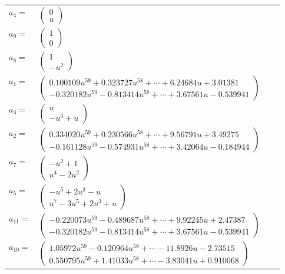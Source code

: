 \documentclass[1p]{elsarticle_modified}
\theoremstyle{definition}
\begin{document}
\begin{tabular}{m{7pt} m{180pt} m{7pt} m{180pt} }
\flushright $a_{4}=$&$\begin{pmatrix}0\\u\end{pmatrix}$ \\
\flushright $a_{9}=$&$\begin{pmatrix}1\\0\end{pmatrix}$ \\
\flushright $a_{8}=$&$\begin{pmatrix}1\\- u^2\end{pmatrix}$ \\
\flushright $a_{1}=$&$\begin{pmatrix}0.100109 u^{59}+0.323727 u^{58}+\cdots+6.24684 u+3.01381\\-0.320182 u^{59}-0.813414 u^{58}+\cdots+3.67561 u-0.539941\end{pmatrix}$ \\
\flushright $a_{3}=$&$\begin{pmatrix}u\\- u^3+u\end{pmatrix}$ \\
\flushright $a_{2}=$&$\begin{pmatrix}0.334020 u^{59}+0.230566 u^{58}+\cdots+9.56791 u+3.49275\\-0.161128 u^{59}-0.574931 u^{58}+\cdots+3.42064 u-0.184944\end{pmatrix}$ \\
\flushright $a_{7}=$&$\begin{pmatrix}- u^2+1\\u^4-2 u^2\end{pmatrix}$ \\
\flushright $a_{5}=$&$\begin{pmatrix}- u^5+2 u^3- u\\u^7-3 u^5+2 u^3+u\end{pmatrix}$ \\
\flushright $a_{11}=$&$\begin{pmatrix}-0.220073 u^{59}-0.489687 u^{58}+\cdots+9.92245 u+2.47387\\-0.320182 u^{59}-0.813414 u^{58}+\cdots+3.67561 u-0.539941\end{pmatrix}$ \\
\flushright $a_{10}=$&$\begin{pmatrix}1.05972 u^{59}-0.120964 u^{58}+\cdots-11.8926 u-2.73515\\0.550795 u^{59}+1.41033 u^{58}+\cdots-3.83041 u+0.910068\end{pmatrix}$ \\

\end{tabular}
\end{document}
